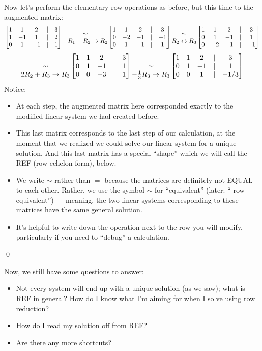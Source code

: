 Now let's perform the elementary row operations as before, but this
time to the augmented matrix:
$$
\left[ \begin{matrix} 1 & 1 & 2 & | & 3\\
1 & -1 & 1 & | & 2\\
0 & 1 & -1 & | & 1 \end{matrix} \right] 
\begin{matrix} \sim\\ -R_1+R_2 \to R_2\\ \end{matrix}
\left[ \begin{matrix} 1 & 1 & 2 & | & 3\\
0 & -2 & -1 & | & -1\\
0 & 1 & -1 & | & 1 \end{matrix} \right]
\begin{matrix} \sim\\ R_2 \leftrightarrow R_3 \end{matrix}
\left[ \begin{matrix} 1 & 1 & 2 & | & 3\\
0 & 1 & -1 & | & 1\\
0 & -2 & -1 & | & -1 \end{matrix} \right]
$$
$$
\begin{matrix} \\ \sim\\ 2R_2 + R_3 \to R_3 \end{matrix}
\left[ \begin{matrix} 1 & 1 & 2 & | & 3\\
0 & 1 & -1 & | & 1\\
0 & 0 & -3 & | & 1 \end{matrix} \right]
\begin{matrix} \\ \sim\\ -\frac13 R_3 \to R_3 \end{matrix}
\left[ \begin{matrix} 1 & 1 & 2 & | & 3\\
0 & 1 & -1 & | & 1\\
0 & 0 & 1 & | & -1/3 \end{matrix} \right]
$$
Notice:
\begin{itemize}
\item At each step, the augmented matrix here corresponded exactly
to the modified linear system we had created before.
\item This last matrix corresponds to the last step of our
calculation, at the moment that we realized we could solve
our linear system for a unique solution.  And this last
matrix has a special ``shape'' which we will call the REF (row
echelon form), below.
\item We write $\sim$ rather than $=$ because the matrices
are definitely not EQUAL to each other.  Rather, we use the
symbol $\sim$ for ``equivalent''  (later: `` row equivalent'') --- meaning, the two 
linear systems corresponding to these matrices have the same
general solution.
\item It's helpful to write down the operation next to the
row you will modify, particularly if you need to ``debug'' 
a calculation.
\end{itemize}
\qed


Now, we still have some questions to answer:
\begin{itemize}
\item Not every system will end up with a unique solution (as we saw);
what is REF in general?  How do I know what I'm aiming for when I
solve using row reduction?
\item How do I read my solution off from REF?  
\item Are there any more shortcuts?
\end{itemize}

